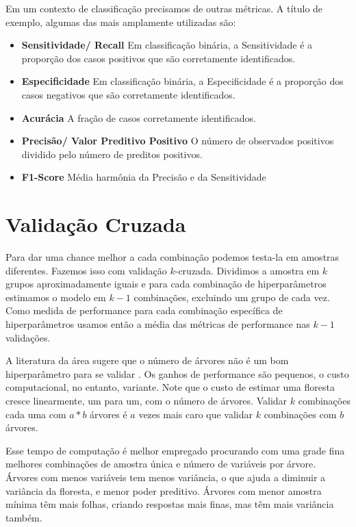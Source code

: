 Em um contexto de classificação precisamos de outras métricas. A título de exemplo, algumas das mais amplamente utilizadas são:

\begin{itemize}
    \item \textbf{Sensitividade/ Recall} \newline
    Em classificação binária, a Sensitividade é a proporção dos casos positivos que são corretamente identificados.
    \item \textbf{Especificidade} \newline
    Em classificação binária, a Especificidade é a proporção dos casos negativos que são corretamente identificados.
    \item \textbf{Acurácia} \newline
    A fração de casos corretamente identificados. 
    \item \textbf{Precisão/ Valor Preditivo Positivo} \newline
    O número de observados positivos dividido pelo número de preditos positivos.
    \item \textbf{F1-Score} \newline
    Média harmônia da Precisão e da Sensitividade
\end{itemize}


\section{Validação Cruzada}

Para dar uma chance melhor a cada combinação podemos testa-la em amostras diferentes. Fazemos isso com validação $k$-cruzada. Dividimos a amostra em $k$ grupos aproximadamente iguais e para cada combinação de hiperparâmetros estimamos o modelo em $k-1$ combinações, excluindo um grupo de cada vez. Como medida de performance para cada combinação específica de hiperparâmetros usamos então a média das métricas de performance nas $k-1$ validações. 

A literatura da área sugere que o número de árvores não é um bom hiperparâmetro para se validar  \cite{claesen2015hyperparameter}. Os ganhos de performance são pequenos, o custo computacional, no entanto, variante. Note que o custo de estimar uma floresta cresce linearmente, um para um, com o número de árvores. Validar $k$ combinações cada uma com $a*b$ árvores é $a$ vezes mais caro que validar $k$ combinações com $b$ árvores. 

Esse tempo de computação é melhor empregado procurando com uma grade fina melhores combinações de amostra única e número de variáveis por árvore. Árvores com menos variáveis tem menos variância, o que ajuda a diminuir a variância da floresta, e menor poder preditivo. Árvores com menor amostra mínima têm mais folhas, criando respostas mais finas, mas têm mais variância também. 


